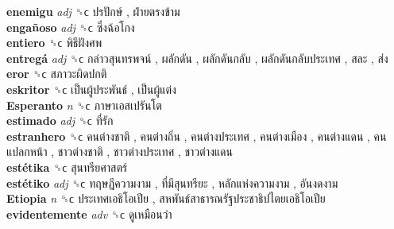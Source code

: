 \textbf{enemigu} \emph{adj}  ␝ϲ   ปรปักษ์ ,  ฝ่ายตรงข้าม   \\
\textbf{engañoso} \emph{adj}  ␝ϲ   ซึ่งฉ้อโกง   \\
\textbf{entiero} ␝ϲ   พิธีฝังศพ   \\
\textbf{entregá} \emph{adj}  ␝ϲ   กล่าวสุนทรพจน์ ,  ผลักดัน ,  ผลักดันกลับ ,  ผลักดันกลับประเทศ ,  สละ ,  ส่ง   \\
\textbf{eror} ␝ϲ   สภาวะผิดปกติ   \\
\textbf{eskritor} ␝ϲ   เป็นผู้ประพันธ์ ,  เป็นผู้แต่ง   \\
\textbf{Esperanto} \emph{n}  ␝ϲ   ภาษาเอสเปรันโต   \\
\textbf{estimado} \emph{adj}  ␝ϲ   ที่รัก   \\
\textbf{estranhero} ␝ϲ   คนต่างชาติ ,  คนต่างถิ่น ,  คนต่างประเทศ ,  คนต่างเมือง ,  คนต่างแดน ,  คนแปลกหน้า ,  ชาวต่างชาติ ,  ชาวต่างประเทศ ,  ชาวต่างแดน   \\
\textbf{estétika} ␝ϲ   สุนทรียศาสตร์   \\
\textbf{estétiko} \emph{adj}  ␝ϲ   ทฤษฎีความงาม ,  ที่มีสุนทรียะ ,  หลักแห่งความงาม ,  อันงดงาม   \\
\textbf{Etiopia} \emph{n}  ␝ϲ   ประเทศเอธิโอเปีย ,  สหพันธ์สาธารณรัฐประชาธิปไตยเอธิโอเปีย   \\
\textbf{evidentemente} \emph{adv}  ␝ϲ   ดูเหมือนว่า   \\
